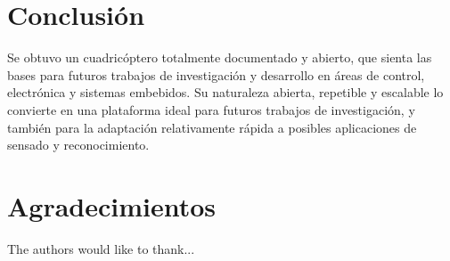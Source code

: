 \documentclass[a4paper, conference]{IEEEtran}
\begin{document}
\section*{Conclusión}

Se obtuvo un cuadricóptero totalmente documentado y abierto, que sienta las bases para futuros trabajos de investigación y desarrollo en áreas de control, electrónica y sistemas embebidos. Su naturaleza abierta, repetible y escalable lo convierte en una plataforma ideal para futuros trabajos de investigación, y también para la adaptación relativamente rápida a posibles aplicaciones de sensado y reconocimiento.

\section*{Agradecimientos}


The authors would like to thank...







%
%
\nocite{*}


%


%
%




\end{document}
